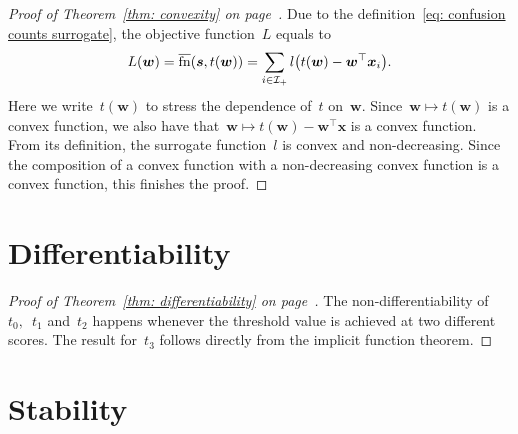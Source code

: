 \thmconvex*
\begin{proof}[Proof of Theorem~\ref{thm: convexity} on page~\pageref{thm: convexity}]
  Due to the definition~\eqref{eq: confusion counts surrogate}, the objective function~$L$ equals to
  \begin{equation*}
    L(\bm{w}) = \fns(\bm{s}, t(\bm{w})) = \sum_{i \in \Ipos} l \Brac{t(\bm{w}) - \bm{w}^{\top} \bm{x}_i}.
  \end{equation*}
  Here we write~$t(\bm{w})$ to stress the dependence of~$t$ on~$\bm{w}$. Since~$\bm{w}\mapsto t(\bm{w})$ is a convex function, we also have that~$\bm{w} \mapsto t(\bm{w}) - \bm{w}^{\top} \bm{x}$ is a convex function. From its definition, the surrogate function~$l$ is convex and non-decreasing.  Since the composition of a convex function with a non-decreasing convex function is a convex function, this finishes the proof.
\end{proof}

\section{Differentiability}

\derivative* 
\begin{proof}[Proof of Theorem~\ref{thm: differentiability} on page~\pageref{thm: differentiability}]
  The non-differentiability of~$t_0,$~$t_1$ and~$t_2$ happens whenever the threshold value is achieved at two different scores. The result for~$t_3$ follows directly from the implicit function theorem. 
\end{proof}

\newpage

\section{Stability}\label{app: stability}

\degeneratebehavior*

